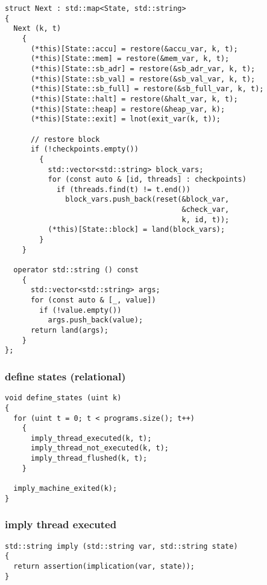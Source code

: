 \begin{lstlisting}[style=c++]
struct Next : std::map<State, std::string>
{
  Next (k, t)
    {
      (*this)[State::accu] = restore(&accu_var, k, t);
      (*this)[State::mem] = restore(&mem_var, k, t);
      (*this)[State::sb_adr] = restore(&sb_adr_var, k, t);
      (*this)[State::sb_val] = restore(&sb_val_var, k, t);
      (*this)[State::sb_full] = restore(&sb_full_var, k, t);
      (*this)[State::halt] = restore(&halt_var, k, t);
      (*this)[State::heap] = restore(&heap_var, k);
      (*this)[State::exit] = lnot(exit_var(k, t));

      // restore block
      if (!checkpoints.empty())
        {
          std::vector<std::string> block_vars;
          for (const auto & [id, threads] : checkpoints)
            if (threads.find(t) != t.end())
              block_vars.push_back(reset(&block_var,
                                         &check_var,
                                         k, id, t));
          (*this)[State::block] = land(block_vars);
        }
    }

  operator std::string () const
    {
      std::vector<std::string> args;
      for (const auto & [_, value])
        if (!value.empty())
          args.push_back(value);
      return land(args);
    }
};
\end{lstlisting}

\subsubsection{define states (relational)}

\begin{lstlisting}[style=c++]
void define_states (uint k)
{
  for (uint t = 0; t < programs.size(); t++)
    {
      imply_thread_executed(k, t);
      imply_thread_not_executed(k, t);
      imply_thread_flushed(k, t);
    }

  imply_machine_exited(k);
}
\end{lstlisting}

\subsubsection{imply thread executed}

\begin{lstlisting}[style=c++]
std::string imply (std::string var, std::string state)
{
  return assertion(implication(var, state));
}
\end{lstlisting}

